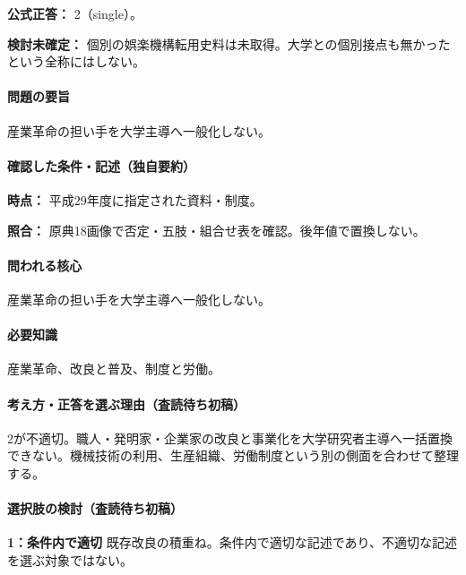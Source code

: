 \textbf{公式正答：} 2（single）。

\par\textbf{検討未確定：} 個別の娯楽機構転用史料は未取得。大学との個別接点も無かったという全称にはしない。

\paragraph{問題の要旨} 産業革命の担い手を大学主導へ一般化しない。

\paragraph{確認した条件・記述（独自要約）}\mbox{}\par

\noindent\textbf{時点：} 平成29年度に指定された資料・制度。\par

\noindent\textbf{照合：} 原典18画像で否定・五肢・組合せ表を確認。後年値で置換しない。\par

\paragraph{問われる核心} 産業革命の担い手を大学主導へ一般化しない。

\paragraph{必要知識} 産業革命、改良と普及、制度と労働。

\paragraph{考え方・正答を選ぶ理由（査読待ち初稿）} 2が不適切。職人・発明家・企業家の改良と事業化を大学研究者主導へ一括置換できない。機械技術の利用、生産組織、労働制度という別の側面を合わせて整理する。

\paragraph{選択肢の検討（査読待ち初稿）}\mbox{}\par

\noindent\textbf{1：条件内で適切} 既存改良の積重ね。条件内で適切な記述であり、不適切な記述を選ぶ対象ではない。\par

